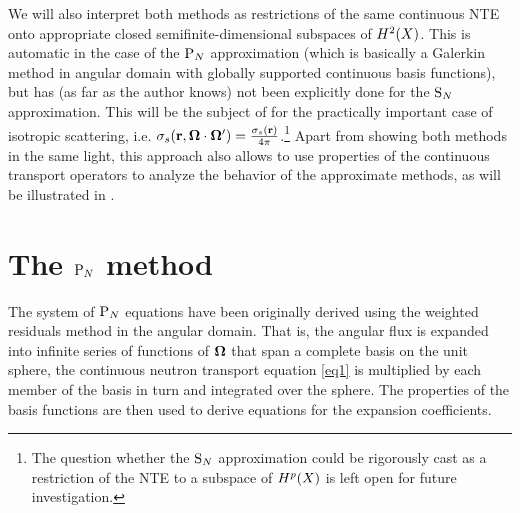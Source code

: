 We will also interpret both methods as restrictions of the same continuous NTE onto appropriate
closed semifinite-dimensional subspaces of $\Hp[2](X)$. This is automatic in the case of the $\PN$ approximation (which
is basically a Galerkin method in angular domain with globally supported continuous basis functions), but has (as far as the author knows) not been
explicitly done for the $\SN$ approximation. 
This will be the subject of  for the practically
important case of isotropic scattering, i.e. $\sigma_s(\br,\bomega\cdot\bomega') =
\tfrac{\sigma_s(\br)}{4\pi}$.\footnote{The question whether the $\SN$ approximation could be rigorously cast as a
restriction of the NTE to a subspace of $\Hp(X)$ is left open for future investigation.} Apart from showing both
methods in the same light, this approach also allows to use properties of the continuous transport operators to analyze the behavior of the approximate methods, as will 
be illustrated in .  


\section{The $\PN$ method}\label{sec:PN}
The system of $\PN$ equations have been originally derived using the weighted
residuals method in the angular domain. That is, the angular flux is expanded into infinite series of functions of
$\bomega$ that span a complete basis on the unit sphere, the continuous neutron transport equation \eqref{eq1} is multiplied by each member of
the basis in turn and integrated over the sphere. The properties of the basis functions are then used to derive
equations for the expansion coefficients. 

